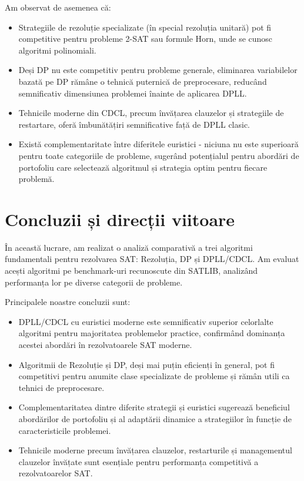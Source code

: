 \documentclass[a4paper,10pt]{article}
\begin{document}
Am observat de asemenea că:

\begin{itemize}
    \item Strategiile de rezoluție specializate (în special rezoluția unitară) pot fi competitive pentru probleme 2-SAT sau formule Horn, unde se cunosc algoritmi polinomiali.
    
    \item Deși DP nu este competitiv pentru probleme generale, eliminarea variabilelor bazată pe DP rămâne o tehnică puternică de preprocesare, reducând semnificativ dimensiunea problemei înainte de aplicarea DPLL.
    
    \item Tehnicile moderne din CDCL, precum învățarea clauzelor și strategiile de restartare, oferă îmbunătățiri semnificative față de DPLL clasic.
    
    \item Există complementaritate între diferitele euristici - niciuna nu este superioară pentru toate categoriile de probleme, sugerând potențialul pentru abordări de portofoliu care selectează algoritmul și strategia optim pentru fiecare problemă.
\end{itemize}

\section{Concluzii și direcții viitoare}

În această lucrare, am realizat o analiză comparativă a trei algoritmi fundamentali pentru rezolvarea SAT: Rezoluția, DP și DPLL/CDCL. Am evaluat acești algoritmi pe benchmark-uri recunoscute din SATLIB, analizând performanța lor pe diverse categorii de probleme.

Principalele noastre concluzii sunt:

\begin{itemize}
    \item DPLL/CDCL cu euristici moderne este semnificativ superior celorlalte algoritmi pentru majoritatea problemelor practice, confirmând dominanța acestei abordări în rezolvatoarele SAT moderne.
    
    \item Algoritmii de Rezoluție și DP, deși mai puțin eficienți în general, pot fi competitivi pentru anumite clase specializate de probleme și rămân utili ca tehnici de preprocesare.
    
    \item Complementaritatea dintre diferite strategii și euristici sugerează beneficiul abordărilor de portofoliu și al adaptării dinamice a strategiilor în funcție de caracteristicile problemei.
    
    \item Tehnicile moderne precum învățarea clauzelor, restarturile și managementul clauzelor învățate sunt esențiale pentru performanța competitivă a rezolvatoarelor SAT.
\end{itemize}
\end{document}
